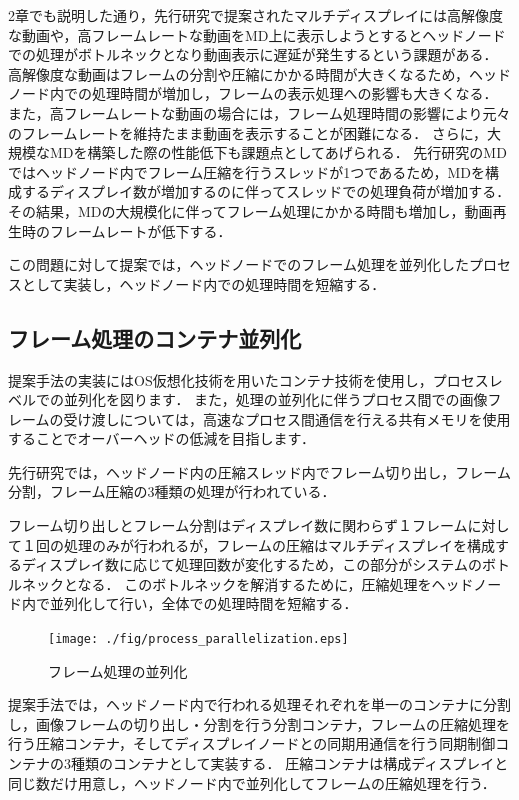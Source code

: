 2章でも説明した通り，先行研究で提案されたマルチディスプレイには高解像度な動画や，高フレームレートな動画をMD上に表示しようとするとヘッドノードでの処理がボトルネックとなり動画表示に遅延が発生するという課題がある．
高解像度な動画はフレームの分割や圧縮にかかる時間が大きくなるため，ヘッドノード内での処理時間が増加し，フレームの表示処理への影響も大きくなる．
また，高フレームレートな動画の場合には，フレーム処理時間の影響により元々のフレームレートを維持たまま動画を表示することが困難になる．
さらに，大規模なMDを構築した際の性能低下も課題点としてあげられる．
先行研究のMDではヘッドノード内でフレーム圧縮を行うスレッドが1つであるため，MDを構成するディスプレイ数が増加するのに伴ってスレッドでの処理負荷が増加する．
その結果，MDの大規模化に伴ってフレーム処理にかかる時間も増加し，動画再生時のフレームレートが低下する．

この問題に対して提案では，ヘッドノードでのフレーム処理を並列化したプロセスとして実装し，ヘッドノード内での処理時間を短縮する．

\subsection*{フレーム処理のコンテナ並列化}
提案手法の実装にはOS仮想化技術を用いたコンテナ技術を使用し，プロセスレベルでの並列化を図ります．
また，処理の並列化に伴うプロセス間での画像フレームの受け渡しについては，高速なプロセス間通信を行える共有メモリを使用することでオーバーヘッドの低減を目指します．

先行研究では，ヘッドノード内の圧縮スレッド内でフレーム切り出し，フレーム分割，フレーム圧縮の3種類の処理が行われている．

フレーム切り出しとフレーム分割はディスプレイ数に関わらず１フレームに対して１回の処理のみが行われるが，フレームの圧縮はマルチディスプレイを構成するディスプレイ数に応じて処理回数が変化するため，この部分がシステムのボトルネックとなる．
このボトルネックを解消するために，圧縮処理をヘッドノード内で並列化して行い，全体での処理時間を短縮する．

\begin{figure}[H]
    \hspace*{\fill}
    \texttt{[image: ./fig/process\_parallelization.eps]}
    \hspace*{\fill}
    \caption{フレーム処理の並列化}
\end{figure}


提案手法では，ヘッドノード内で行われる処理それぞれを単一のコンテナに分割し，画像フレームの切り出し・分割を行う分割コンテナ，フレームの圧縮処理を行う圧縮コンテナ，そしてディスプレイノードとの同期用通信を行う同期制御コンテナの3種類のコンテナとして実装する．
圧縮コンテナは構成ディスプレイと同じ数だけ用意し，ヘッドノード内で並列化してフレームの圧縮処理を行う．



